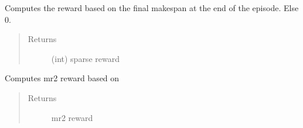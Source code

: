 \documentclass[letterpaper,10pt,english]{sphinxmanual}
\begin{document}
\begin{fulllineitems}
\begin{fulllineitems}
\begin{quote}
\begin{description}
\end{description}\end{quote}

\end{fulllineitems}


\begin{fulllineitems}
\label{\detokenize{environments:environments.env_tetris_scheduling.Env.sparse_makespan_reward}}
\sphinxAtStartPar
Computes the reward based on the final makespan at the end of the episode. Else 0.
\begin{quote}\begin{description}
\item[{Returns}] \leavevmode
\sphinxAtStartPar
(int) sparse reward

\end{description}\end{quote}

\end{fulllineitems}


\begin{fulllineitems}
\label{\detokenize{environments:environments.env_tetris_scheduling.Env.mr2_reward}}
\sphinxAtStartPar
Computes mr2 reward based on 
\begin{quote}\begin{description}
\item[{Returns}] \leavevmode
\sphinxAtStartPar
mr2 reward

\end{description}\end{quote}

\end{fulllineitems}



\end{fulllineitems}
\end{document}
